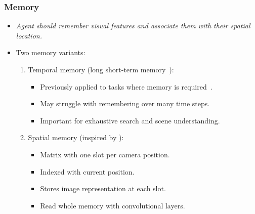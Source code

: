 \begin{frame}
    \frametitle{Memory}

    \begin{itemize}
        \item \textit{Agent should remember visual features and associate them with their spatial location.}
        \item Two memory variants:
        \begin{enumerate}
            \item Temporal memory (long short-term memory~\cite{hochreiter_long_1997}):
            \begin{itemize}
                \item Previously applied to tasks where memory is required~\cite{hausknecht_deep_2017,mnih_asynchronous_2016,mirowski_learning_2017,gupta_cognitive_2019}.
                \item May struggle with remembering over many time steps.
                \item Important for exhaustive search and scene understanding.
            \end{itemize}
            \item Spatial memory (inspired by \cite{parisotto_neural_2017}):
            \begin{itemize}
                \item Matrix with one slot per camera position.
                \item Indexed with current position.
                \item Stores image representation at each slot.
                \item Read whole memory with convolutional layers.
            \end{itemize}
        \end{enumerate}
    \end{itemize}
\end{frame}

